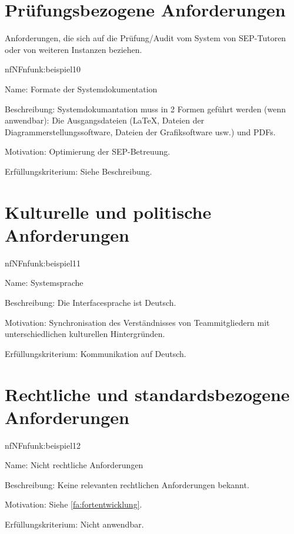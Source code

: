 \section{Prüfungsbezogene Anforderungen}

Anforderungen, die sich auf die Prüfung/Audit vom System von SEP-Tutoren oder von weiteren Instanzen beziehen.


\begin{description}[leftmargin=5em, style=sameline]	
	\begin{lhp}{nf}{NF}{nfunk:beispiel10}
		\item [Name:] Formate der Systemdokumentation
		\item [Beschreibung:] Systemdokumantation muss in 2 Formen geführt werden (wenn anwendbar): Die Ausgangsdateien (\LaTeX, Dateien der Diagrammerstellungssoftware, Dateien der Grafiksoftware usw.) und PDFs.
		\item [Motivation:] Optimierung der SEP-Betreuung.
		\item [Erfüllungskriterium:] Siehe Beschreibung.
	\end{lhp}
\end{description}

\section{Kulturelle und politische Anforderungen}


\begin{description}[leftmargin=5em, style=sameline]	
	\begin{lhp}{nf}{NF}{nfunk:beispiel11}
		\item [Name:] Systemsprache
		\item [Beschreibung:] Die Interfacesprache ist Deutsch.
		\item [Motivation:] Synchronisation des Verständnisses von Teammitgliedern mit unterschiedlichen kulturellen Hintergründen.
		\item [Erfüllungskriterium:] {Kommunikation auf Deutsch.}
	\end{lhp}
\end{description}

\section{Rechtliche und standardsbezogene Anforderungen}


\begin{description}[leftmargin=5em, style=sameline]	
	\begin{lhp}{nf}{NF}{nfunk:beispiel12}
		\item [Name:] Nicht rechtliche Anforderungen
		\item [Beschreibung:] Keine relevanten rechtlichen Anforderungen bekannt.
		\item [Motivation:] Siehe \ref{fa:fortentwicklung}.
		\item [Erfüllungskriterium:] Nicht anwendbar.
	\end{lhp}
\end{description}
